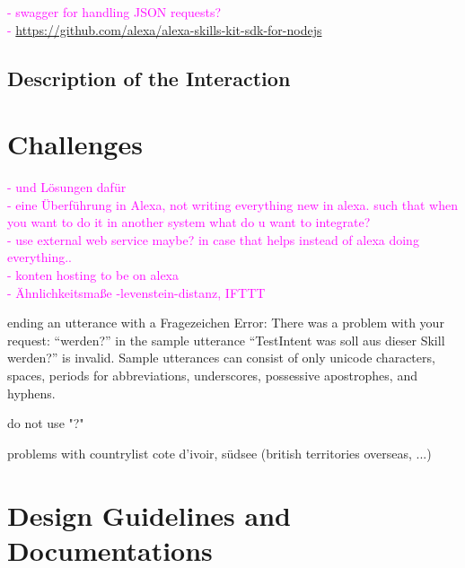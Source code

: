 
\textcolor{magenta}{
- swagger for handling JSON requests?\\
- \url{https://github.com/alexa/alexa-skills-kit-sdk-for-nodejs}
}


\subsection*{Description of the Interaction}


\section{Challenges}

\textcolor{magenta}{
- und L\"osungen daf\"ur\\
- eine \"Uberf\"uhrung in Alexa, not writing everything new in alexa. such that when you want to do it in another system what do u want to integrate?\\
- use external web service maybe? in case that helps instead of alexa doing everything..\\
- konten hosting to be on alexa\\
- \"Ahnlichkeitsma{\ss}e -levenstein-distanz, IFTTT
}

ending an utterance with a Fragezeichen
Error: There was a problem with your request: ``werden?'' in the sample utterance ``TestIntent was soll aus dieser Skill werden?'' is invalid. Sample utterances can consist of only unicode characters, spaces, periods for abbreviations, underscores, possessive apostrophes, and hyphens.

do not use "?"


problems with countrylist
cote d'ivoir, südsee (british territories overseas, ...)



\section{Design Guidelines and Documentations}
\label{designGuide}






